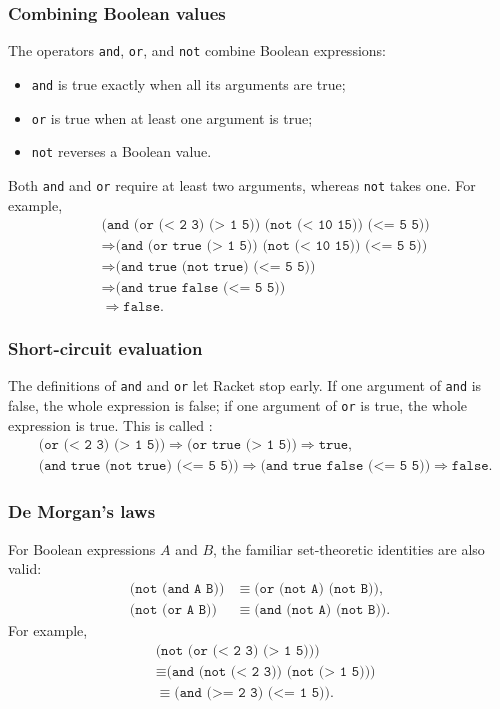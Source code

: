 \subsubsection{Combining Boolean values}
The operators \texttt{and}, \texttt{or}, and \texttt{not} combine Boolean
expressions:
\begin{itemize}
  \item \texttt{and} is true exactly when all its arguments are true;
  \item \texttt{or} is true when at least one argument is true;
  \item \texttt{not} reverses a Boolean value.
\end{itemize}
Both \texttt{and} and \texttt{or} require at least two arguments, whereas
\texttt{not} takes one.  For example,
\begin{align*}
&\texttt{(and (or (< 2 3) (> 1 5)) (not (< 10 15)) (<= 5 5))} \\
&\Rightarrow \texttt{(and (or true (> 1 5)) (not (< 10 15)) (<= 5 5))} \\
&\Rightarrow \texttt{(and true (not true) (<= 5 5))} \\
&\Rightarrow \texttt{(and true false (<= 5 5))} \\
&\Rightarrow \texttt{false}.
\end{align*}

\subsubsection{Short-circuit evaluation}
The definitions of \texttt{and} and \texttt{or} let Racket stop early.  If
one argument of \texttt{and} is false, the whole expression is false; if one
argument of \texttt{or} is true, the whole expression is true.  This is called
:
\begin{align*}
  &\texttt{(or (< 2 3) (> 1 5))}
     \Rightarrow \texttt{(or true (> 1 5))}\Rightarrow\texttt{true},\\
  &\texttt{(and true (not true) (<= 5 5))}
     \Rightarrow \texttt{(and true false (<= 5 5))}\Rightarrow\texttt{false}.
\end{align*}

\subsubsection{De Morgan's laws}
For Boolean expressions $A$ and $B$, the familiar set-theoretic identities
are also valid:
\begin{align*}
\texttt{(not (and A B))}
  &\equiv \texttt{(or (not A) (not B))},\\
\texttt{(not (or A B))}
  &\equiv \texttt{(and (not A) (not B))}.
\end{align*}
For example,
\begin{align*}
&\texttt{(not (or (< 2 3) (> 1 5)))} \\
&\equiv \texttt{(and (not (< 2 3)) (not (> 1 5)))} \\
&\equiv \texttt{(and (>= 2 3) (<= 1 5))}.
\end{align*}

